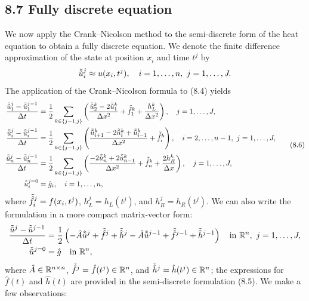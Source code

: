 \subsection{8.7 Fully discrete equation}
We now apply the Crank--Nicolson method to the semi-discrete form of the heat equation to obtain a fully discrete equation. We denote the finite difference approximation of the state at position $x_i$ and time $t^j$ by
\[\tilde{\tilde{u}}_i^j \approx u(x_i, t^j), \quad i = 1, \dots, n, \ j = 1, \dots, J.\]
The application of the Crank--Nicolson formula to (8.4) yields
\begin{equation*}
    \begin{aligned}
        \frac{\uu_1^j - \uu_1^{j-1}}{\Delta t} &= \frac{1}{2} \sum_{k \in \{j-1, j\}} \left(\frac{\uu_2^k - 2\uu_1^k}{\Delta x^2} + \fh_1^k + \frac{h_L^k}{\Delta x^2}\right), \quad j = 1, \dots, J, \\
        \frac{\uu_i^j - \uu_i^{j-1}}{\Delta t} &= \frac{1}{2} \sum_{k \in \{j-1, j\}} \left(\frac{\uu_{i+1}^k - 2\uu_i^k + \uu_{i-1}^k}{\Delta x^2} + \fh_i^k\right), \quad i = 2, \dots, n - 1, \ j = 1, \dots, J, \\
        \frac{\uu_n^j - \uu_n^{j-1}}{\Delta t} &= \frac{1}{2} \sum_{k \in \{j-1, j\}} \left(\frac{-2\uu_n^k + 2\uu_{n-1}^k}{\Delta x^2} + \fh_n^k + \frac{2h_R^k}{\Delta x}\right), \quad j = 1, \dots, J, \\
        \uu_i^{j=0} &= \hat{g}_i, \quad i = 1, \dots, n,
    \end{aligned} \tag{8.6}
\end{equation*}
where $\tilde{\hat{f}}_i^j = f(x_i, t^j)$, $h_L^j = h_L(t^j)$, and $h_R^j = h_R(t^j)$. We can also write the formulation in a more compact matrix-vector form:
\begin{align*}
    \frac{\tilde{\tilde{u}}^j - \tilde{\tilde{u}}^{j-1}}{\Delta t} &= \frac{1}{2} \left(-\hat{A}\tilde{\tilde{u}}^j + \tilde{\hat{f}}^j + \tilde{\hat{h}}^j - \hat{A}\tilde{\tilde{u}}^{j-1} + \tilde{\hat{f}}^{j-1} + \tilde{\hat{h}}^{j-1}\right) \quad \text{in } \mathbb{R}^n, \ j = 1, \dots, J, \\
    \tilde{\tilde{u}}^{j=0} &= \hat{g} \quad \text{in } \mathbb{R}^n,
\end{align*}
where $\hat{A} \in \mathbb{R}^{n \times n}$, $\tilde{\hat{f}}^j = \hat{f}(t^j) \in \mathbb{R}^n$, and $\tilde{\hat{h}}^j = \hat{h}(t^j) \in \mathbb{R}^n$; the expressions for $\hat{f}(t)$ and $\hat{h}(t)$ are provided in the semi-discrete formulation (8.5). We make a few observations:
